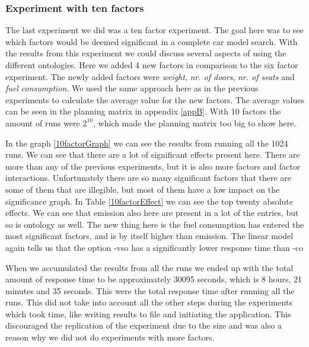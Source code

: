 \documentclass{llncs}
\begin{document}
\subsubsection{Experiment with ten factors}
The last experiment we did was a ten factor experiment. The goal here
was to see which factors would be deemed significant in a complete car
model search. With the results from this experiment we could discuss
several aspects of using the different ontologies.  Here we added 4
new factors in comparison to the six factor experiment. The newly
added factors were \emph{weight}, \emph{nr. of doors},
\emph{nr. of seats} and \emph{fuel consumption}. We used the same
approach here as in the previous experiments to calculate the average
value for the new factors. The average values can be seen in the
planning matrix in appendix \ref{appB}. With 10 factors the amount of
runs were $2^{10}$, which made the planning matrix too big to show here.

In the graph \ref{10factorGraph} we can see the results from running
all the 1024 runs.  We can see that there are a lot of significant
effects present here. There are more than any of the previous
experiments, but it is also more factors and factor interactions.
Unfortunately there are so many significant factors that there are
some of them that are illegible, but most of them have a low impact on
the significance graph.  In Table \ref{10factorEffect} we can see the top
twenty absolute effects. We can see that emission also here are present in a lot of the
entries, but so is ontology as well. The new thing here is the fuel
consumption has entered the most significant factors, and is by itself
higher than emission. The linear model again tells us that the option
\textsf{-vso} has a significantly lower response time than
\textsf{-co}

When we accumulated the results from all the runs we ended up with the
total amount of response time to be approximately 30095 seconds, which
is 8 hours, 21 minutes and 35 seconds.  This were the total response
time after running all the runs. This did not take into account all
the other steps during the experiments which took time, like writing
results to file and initiating the application.  This discouraged the
replication of the experiment due to the size and was also a reason
why we did not do experiments with more factors.
\end{document}

